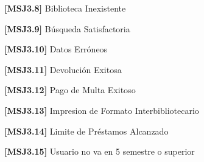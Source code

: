 	\begin{Citemize}
	\item {\bf [MSJ3.8]} Biblioteca Inexistente
	\end{Citemize}
	
	\begin{Citemize}
	\item {\bf [MSJ3.9]} Búsqueda Satisfactoria
	\end{Citemize}
	
	\begin{Citemize}
	\item {\bf [MSJ3.10]} Datos Erróneos
	\end{Citemize}
	
	\begin{Citemize}
	\item {\bf [MSJ3.11]} Devolución Exitosa
	\end{Citemize}
	
	\begin{Citemize}
	\item {\bf [MSJ3.12]} Pago de Multa Exitoso
	\end{Citemize}
	
	\begin{Citemize}
	\item {\bf [MSJ3.13]} Impresion de Formato Interbibliotecario
	\end{Citemize}
	
	\begin{Citemize}
	\item {\bf [MSJ3.14]} Limite de Préstamos Alcanzado
	\end{Citemize}
	
	\begin{Citemize}
	\item {\bf [MSJ3.15]} Usuario no va en 5 semestre o superior
	\end{Citemize}
